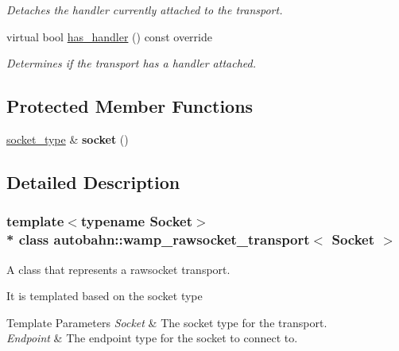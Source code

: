 \begin{DoxyCompactItemize}
\begin{DoxyCompactList}\small\item\em Detaches the handler currently attached to the transport. \end{DoxyCompactList}\item 
virtual bool \hyperlink{classautobahn_1_1wamp__rawsocket__transport_a89dedf7b3cbc23b24118f068cb8098f9}{has\+\_\+handler} () const override
\begin{DoxyCompactList}\small\item\em Determines if the transport has a handler attached. \end{DoxyCompactList}\end{DoxyCompactItemize}
\subsection*{Protected Member Functions}
\begin{DoxyCompactItemize}
\item 
\hyperlink{classautobahn_1_1wamp__rawsocket__transport_aa11aea0af1d26f4ead1cfb07f877034b}{socket\+\_\+type} \& {\bfseries socket} ()\hypertarget{classautobahn_1_1wamp__rawsocket__transport_ab7e6b19e8b8d24b79e126a10f616c83c}{}\label{classautobahn_1_1wamp__rawsocket__transport_ab7e6b19e8b8d24b79e126a10f616c83c}

\end{DoxyCompactItemize}


\subsection{Detailed Description}
\subsubsection*{template$<$typename Socket$>$\\*
class autobahn\+::wamp\+\_\+rawsocket\+\_\+transport$<$ Socket $>$}

A class that represents a rawsocket transport. 

It is templated based on the socket type


\begin{DoxyTemplParams}{Template Parameters}
{\em Socket} & The socket type for the transport. \\
\hline
{\em Endpoint} & The endpoint type for the socket to connect to. \\
\hline
\end{DoxyTemplParams}



